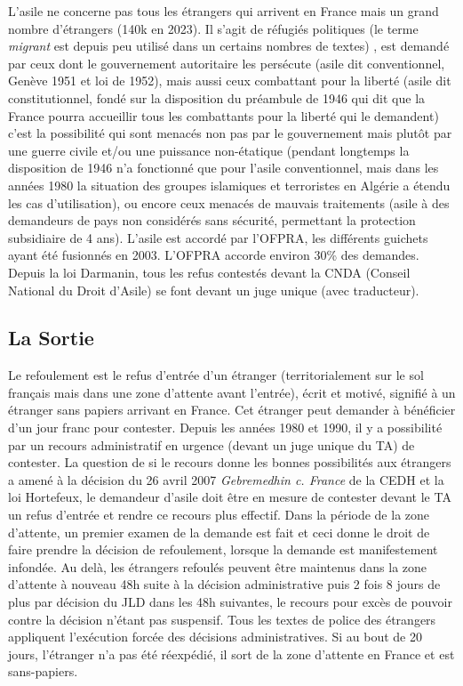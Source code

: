 \documentclass[math]{cours}
\begin{document}
L'asile ne concerne pas tous les étrangers qui arrivent en France mais un grand nombre d'étrangers (140k en 2023).
Il s'agit de réfugiés politiques (le terme \emph{migrant} est depuis peu utilisé dans un certains nombres de textes)
, est demandé par ceux dont le gouvernement autoritaire les persécute (asile dit conventionnel, Genève 1951 et loi de 1952), mais aussi ceux combattant pour la liberté (asile dit constitutionnel, fondé sur la disposition du préambule de 1946 qui dit que la France pourra accueillir tous les combattants pour la liberté qui le demandent)
c'est la possibilité qui sont menacés non pas par le gouvernement mais plutôt par une guerre civile et/ou une puissance non-étatique (pendant longtemps la disposition de 1946 n'a fonctionné que pour l'asile conventionnel, mais dans les années 1980 la situation des groupes islamiques et terroristes en Algérie a étendu les cas d'utilisation),
ou encore ceux menacés de mauvais traitements (asile à des demandeurs de pays non considérés sans sécurité, permettant la protection subsidiaire de 4 ans).
L'asile est accordé par l'OFPRA, les différents guichets ayant été fusionnés en 2003.
L'OFPRA accorde environ 30\% des demandes.
Depuis la loi Darmanin, tous les refus contestés devant la CNDA (Conseil National du Droit d'Asile) se font devant un juge unique (avec traducteur).

\subsection{La Sortie}
Le refoulement est le refus d'entrée d'un étranger (territorialement sur le sol français mais dans une zone d'attente avant l'entrée), écrit et motivé, signifié à un étranger sans papiers arrivant en France.
Cet étranger peut demander à bénéficier d'un jour franc pour contester.
Depuis les années 1980 et 1990, il y a possibilité par un recours administratif en urgence (devant un juge unique du TA) de contester.
La question de si le recours donne les bonnes possibilités aux étrangers a amené à la décision du 26 avril 2007 \emph{Gebremedhin c. France} de la CEDH et la loi Hortefeux, le demandeur d'asile doit être en mesure de contester devant le TA un refus d'entrée et rendre ce recours plus effectif.
Dans la période de la zone d'attente, un premier examen de la demande est fait et ceci donne le droit de faire prendre la décision de refoulement, lorsque la demande est manifestement infondée.
Au delà, les étrangers refoulés peuvent être maintenus dans la zone d'attente à nouveau 48h suite à la décision administrative puis 2 fois 8 jours de plus par décision du JLD dans les 48h suivantes, le recours pour excès de pouvoir contre la décision n'étant pas suspensif.
Tous les textes de police des étrangers appliquent l'exécution forcée des décisions administratives.
Si au bout de 20 jours, l'étranger n'a pas été réexpédié, il sort de la zone d'attente en France et est sans-papiers.
\end{document}
